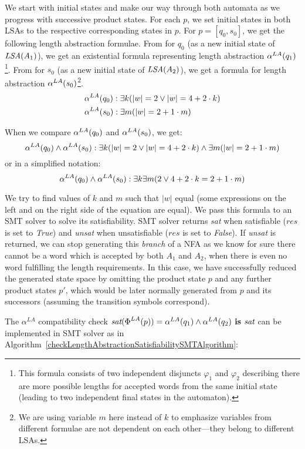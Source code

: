 We start with initial states and make our way through both automata as we progress with successive product states. For each $p$, we set initial states in both LSAs to the respective corresponding states in $p$. For $p = [q_0, s_0]$, we get the following length abstraction formulae. From  for $q_0$ (as a new initial state of $\emph{LSA}(A_1)$), we get an existential formula representing length abstraction $\alpha^{LA}(q_1)$\footnote{This formula consists of two independent disjuncts $\varphi_1$ and $\varphi_2$ describing there are more possible lengths for accepted words from the same initial state (leading to two independent final states in the automaton).}. From  for $s_0$ (as a new initial state of $\emph{LSA}(A_2)$), we get a formula for length abstraction $\alpha^{LA}(s_0)$\footnote{We are using variable $m$ here instead of $k$ to emphasize variables from different formulae are not dependent on each other---they belong to different LSAs.}.
\begin{align*}
    &\alpha^{LA}(q_0): \exists k ( |w| = 2 \lor |w| = 4 + 2 \cdot k ) \\
    &\alpha^{LA}(s_0): \exists m ( |w| = 2 + 1 \cdot m )
\end{align*}

When we compare $\alpha^{LA}(q_0)$ and $\alpha^{LA}(s_0)$, we get:
\[
    \alpha^{LA}(q_0) \land \alpha^{LA}(s_0) : \exists k ( |w| = 2 \lor |w| = 4 + 2 \cdot k ) \land \exists m ( |w| = 2 + 1 \cdot m )
\]
or in a simplified notation:
$$ \alpha^{LA}(q_0) \land \alpha^{LA}(s_0) : \exists k \exists m ( 2 \lor 4 + 2 \cdot k = 2 + 1 \cdot m ) $$

We try to find values of $k$ and $m$ such that $|w|$ equal (some expressions on the left and on the right side of the equation are equal). We pass this formula to an SMT solver to solve its satisfiability. SMT solver returns \emph{sat} when satisfiable ($res$ is set to \emph{True}) and \emph{unsat} when unsatisfiable ($res$ is set to \emph{False}). If \emph{unsat} is returned, we can stop generating this \emph{branch} of a NFA as we know for sure there cannot be a word which is accepted by both $A_1$ and $A_2$, when there is even no word fulfilling the length requirements. In this case, we have successfully reduced the generated state space by omitting the product state $p$ and any further product states $p'$, which would be later normally generated from $p$ and its successors (assuming the transition symbols correspond).

The $\alpha^{LA}$ compatibility check $\emph{sat}(\emph{$\Phi$}^{LA}(p)) = \alpha^{LA}(q_1) \land \alpha^{LA}(q_2) \textbf{ is } \emph{sat}$ can be implemented in SMT solver as in Algorithm~\ref{checkLengthAbstractionSatisfiabilitySMTAlgorithm}:

